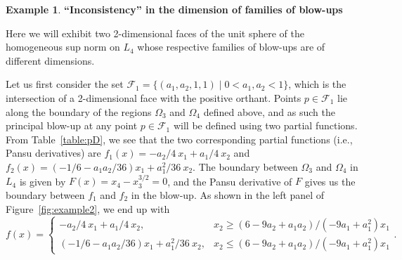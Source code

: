 \documentclass{article}
\theoremstyle{definition}
\newtheorem{ex}[theorem]{Example}
\newcommand{\cF}{{\mathcal F}}
\begin{document}
\begin{ex}\textbf{``Inconsistency'' in the dimension of families of blow-ups}\label{ex:inconsistency}

Here we will exhibit two 2-dimensional faces of the unit sphere of the homogeneous sup norm on $L_4$ whose respective families of blow-ups are of different dimensions.

Let us first consider the set $\mathcal F_1 = \{(a_1,a_2,1,1)\mid 0< a_1,a_2 <1\}$, which is the intersection of a 2-dimensional face with the positive orthant. Points $p \in \mathcal F_1$ lie along the boundary of the regions $\Omega_3$ and $\Omega_4$ defined above, and as such the principal blow-up at any point $p \in \cF_1$ will be defined using two partial functions. From Table~\ref{table:pD}, we see that the two corresponding partial functions (i.e., Pansu derivatives) are $f_1(x) = -a_2/4\:x_1 + a_1/4\:x_2$ and $f_2(x) = (-1/6 - a_1a_2/36) x_1 + a_1^2/36\:x_2$. The boundary between $\Omega_3$ and $\Omega_4$ in $L_4$ is given by $F(x) = x_4 - x_3^{3/2} = 0$, and the Pansu derivative of $F$ gives us the boundary between $f_1$ and $f_2$ in the blow-up. As shown in the left panel of Figure~\ref{fig:example2}, we end up with
\[
f(x) = \begin{cases}
-a_2/4\:x_1 + a_1/4\:x_2, & x_2 \geq (6-9a_2 + a_1a_2)/(-9a_1 + a_1^2) x_1\\
(-1/6 - a_1a_2/36) x_1 + a_1^2/36\:x_2, & x_2 \leq (6-9a_2 + a_1a_2)/(-9a_1 + a_1^2) x_1
\end{cases}.
\]

\begin{figure}[h]
\centering
{}
\end{figure}
\end{ex}
\end{document}

